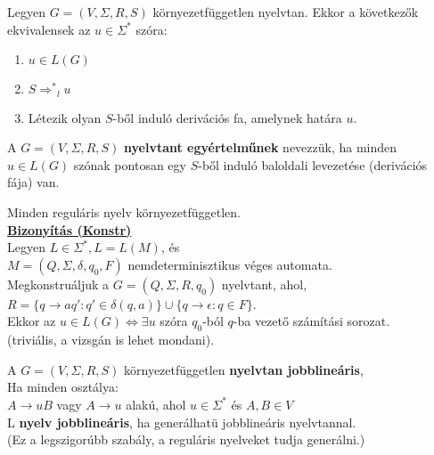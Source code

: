 \documentclass{beamer}
\newcommand{\msmallskip}{\vspace{0.3em}}
\newcommand{\mmedskip}{\vspace{0.5em}}
\newcommand{\mbigskip}{\vspace{1em}}
\begin{document}
\begin{frame}
\begin{tcolorbox}[title={Tétel: Ekvivalens állítások derivációs fákra}]
Legyen $G = (V, {\Sigma}, R, S)$ környezetfüggetlen nyelvtan. Ekkor a következők ekvivalensek az $u \in {\Sigma}^*$ szóra:\\
\begin{enumerate}
\item $u \in L(G)$
\item $S {{\Rightarrow}^*}_l u$
\item Létezik olyan $S$-ből induló derivációs fa, amelynek határa $u$.
\end{enumerate}
\end{tcolorbox}

\end{frame}

\begin{frame}
\begin{tcolorbox}[title={Egyértelmű nyelvtan}]
A $G = (V, {\Sigma}, R, S)$ \textbf{nyelvtant egyértelműnek} nevezzük, ha minden $u \in L(G)$ szónak pontosan egy $S$-ből induló baloldali levezetése (derivációs fája) van.
\end{tcolorbox}
\end{frame}

\begin{frame}
\begin{tcolorbox}[title={Tétel: Reguláris nyelv környezetfüggetlen}]
Minden reguláris nyelv környezetfüggetlen.\\
\tcblower
\msmallskip
\underline{\textbf{Bizonyítás (Konstr)}}\\
\mmedskip
Legyen $L \in {\Sigma}^*, L = L(M)$, és\\
$M = (Q, {\Sigma}, {\delta}, q_0, F)$ nemdeterminisztikus véges automata.\\
\mbigskip
Megkonstruáljuk a $G = (Q, {\Sigma}, R, q_0)$ nyelvtant, ahol,\\
$R = \{q \rightarrow aq' : q' \in {\delta}(q, a)\} \cup \{q \rightarrow \epsilon : q \in F \}$.\\
Ekkor az $u \in  L(G) \iff \exists u$ szóra $q_0$-ból $q$-ba vezető számítási sorozat.\\
(triviális, a vizsgán is lehet mondani).
\end{tcolorbox}

\end{frame}

\begin{frame}
\begin{tcolorbox}[title={Jobblineáris nyelvtan, nyelv}]
A $G = (V, {\Sigma}, R, S)$ környezetfüggetlen \textbf{nyelvtan jobblineáris},\\
Ha minden osztálya:\\
\mmedskip
$A \rightarrow uB$ vagy $A \rightarrow u$ alakú, ahol $u \in {\Sigma}^*$ és $A, B \in V$\\
\mbigskip
L \textbf{nyelv jobblineáris}, ha generálhatü jobblineáris nyelvtannal.\\
\msmallskip
(Ez a legszigorúbb szabály, a reguláris nyelveket tudja generálni.)
\end{tcolorbox}
\end{frame}
\end{document}
